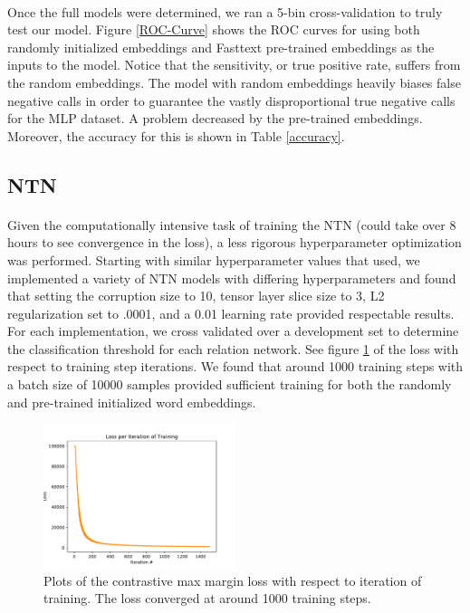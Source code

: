 \documentclass[11.5pt]{article}
\newcounter{Figure}
\newcounter{graphics}
\begin{document}
 
 \paragraph{} Once the full models were determined, we ran a 5-bin cross-validation to truly test our model. Figure \ref{ROC-Curve} shows the ROC curves for using both randomly initialized embeddings and Fasttext pre-trained embeddings as the inputs to the model. Notice that the sensitivity, or true positive rate, suffers from the random embeddings. The model with random embeddings heavily biases false negative calls in order to guarantee the vastly disproportional true negative calls for the MLP dataset. A problem decreased by the pre-trained embeddings. Moreover, the accuracy for this is shown in Table \ref{accuracy}.  
 

 
\subsection{NTN}
\paragraph{} Given the computationally intensive task of training the NTN (could take over 8 hours to see convergence in the loss), a less rigorous hyperparameter optimization was performed. Starting with similar hyperparameter values that  \cite{socher2013reasoning} used, we implemented a variety of NTN models with differing hyperparameters and found that setting the corruption size to 10, tensor layer slice size to 3, L2 regularization set to .0001, and a 0.01 learning rate provided respectable results. For each implementation, we cross validated over a development set to determine the classification threshold for each relation network. See figure \ref{_loss_.pdf} of the loss with respect to training step iterations. We found that around 1000 training steps with a batch size of 10000 samples provided sufficient training for both the randomly and pre-trained initialized word embeddings.

 \begin{figure}[h!]
\centerline{\includegraphics[width=0.5\textwidth]{report_ntn/_loss_.pdf}}
  \caption{\small Plots of the contrastive max margin loss with respect to iteration of training. The loss converged at around 1000 training steps. }
\label{_loss_.pdf}
\end{figure}
\end{document}
